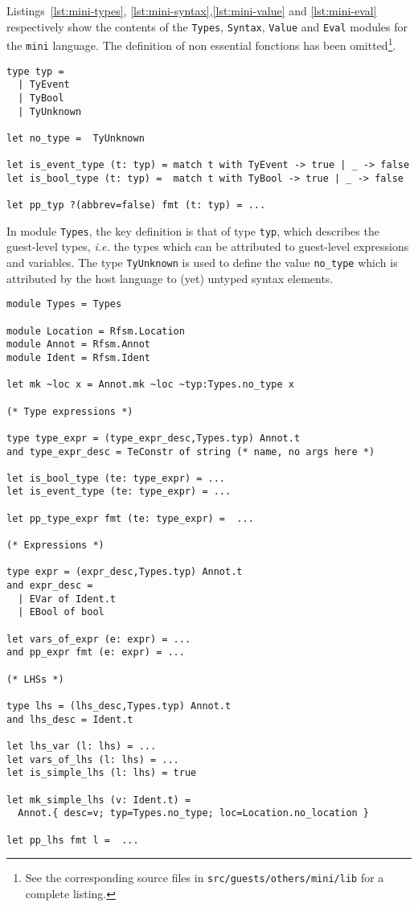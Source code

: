 Listings~\ref{lst:mini-types}, \ref{lst:mini-syntax},\ref{lst:mini-value} and \ref{lst:mini-eval}
respectively show the contents of the \texttt{Types},
\texttt{Syntax}, \texttt{Value} and \texttt{Eval} modules for the \texttt{mini} language.
The definition of non essential fonctions has been omitted\footnote{See the corresponding source files in
  \texttt{src/guests/others/mini/lib} for a complete listing.}.

\begin{lstlisting}[language={[Objective]Caml},frame=single,basicstyle=\small,caption={Module
    \texttt{Guest.Types} (excerpt)},label={lst:mini-types}]
type typ =
  | TyEvent
  | TyBool
  | TyUnknown

let no_type =  TyUnknown

let is_event_type (t: typ) = match t with TyEvent -> true | _ -> false
let is_bool_type (t: typ) =  match t with TyBool -> true | _ -> false

let pp_typ ?(abbrev=false) fmt (t: typ) = ...
\end{lstlisting}

In module \texttt{Types}, the key definition is that of type \texttt{typ}, which describes the
guest-level types, \emph{i.e.} the types which can be attributed to guest-level expressions and
variables. The type \texttt{TyUnknown} is used to define the value \texttt{no_type} which is
attributed by the host language to (yet) untyped syntax elements.

\begin{lstlisting}[language={[Objective]Caml},frame=single,basicstyle=\small,caption={Module
    \texttt{Guest.Syntax} (excerpt)}, label={lst:mini-syntax}]
module Types = Types

module Location = Rfsm.Location
module Annot = Rfsm.Annot
module Ident = Rfsm.Ident

let mk ~loc x = Annot.mk ~loc ~typ:Types.no_type x

(* Type expressions *)

type type_expr = (type_expr_desc,Types.typ) Annot.t
and type_expr_desc = TeConstr of string (* name, no args here *)

let is_bool_type (te: type_expr) = ...
let is_event_type (te: type_expr) = ...

let pp_type_expr fmt (te: type_expr) =  ...

(* Expressions *)
  
type expr = (expr_desc,Types.typ) Annot.t
and expr_desc = 
  | EVar of Ident.t
  | EBool of bool

let vars_of_expr (e: expr) = ...
and pp_expr fmt (e: expr) = ...

(* LHSs *)
  
type lhs = (lhs_desc,Types.typ) Annot.t
and lhs_desc = Ident.t

let lhs_var (l: lhs) = ...
let vars_of_lhs (l: lhs) = ...
let is_simple_lhs (l: lhs) = true

let mk_simple_lhs (v: Ident.t) =
  Annot.{ desc=v; typ=Types.no_type; loc=Location.no_location }

let pp_lhs fmt l =  ...
\end{lstlisting}

